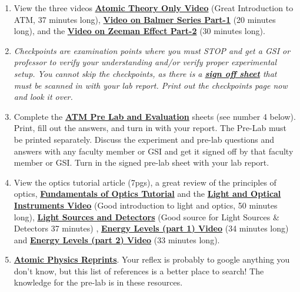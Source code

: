 \documentclass{../lab}
\begin{document}
\begin{enumerate}
    \item View the three videos \href{http://youtu.be/iJ\_4ygOaE7A}{\textbf{Atomic Theory Only Video}} (Great Introduction to ATM, 37 minutes long), \href{http://youtu.be/M41IKkUAG-A}{\textbf{Video on Balmer Series Part-1}} (20 minutes long), and the \href{http://youtu.be/-l2chO5SLew}{\textbf{Video on Zeeman Effect Part-2}} (30 minutes long).

    \item \emph{Checkpoints are examination points where you must STOP and get a GSI or professor to verify your understanding and/or verify proper experimental setup. You cannot skip the checkpoints, as there is a \href{http://experimentationlab.berkeley.edu/node/128}{\textbf{sign off sheet}} that must be scanned in with your lab report. Print out the checkpoints page now and look it over.}

    \item Complete the \href{http://experimentationlab.berkeley.edu/ATMPreLab}{\textbf{ATM Pre Lab and Evaluation}} sheets (see number 4 below). Print, fill out the answers, and turn in with your report. The Pre-Lab must be printed separately. Discuss the experiment and pre-lab questions and answers with any faculty member or GSI and get it signed off by that faculty member or GSI. Turn in the signed pre-lab sheet with your lab report.

    \item View the optics tutorial article (7pgs), a great review of the principles of optics, \href{http://experimentationlab.berkeley.edu/sites/default/files/QIE/fundamental-Optics.pdf}{\textbf{Fundamentals of Optics Tutorial}}\textbf{ }and the \href{http://youtu.be/zUGBt5vc5FA}{\textbf{Light and Optical Instruments Video}}\textbf{ }(Good introduction to light and optics, 50 minutes long), \href{http://youtu.be/lQKLakISoBA}{\textbf{Light Sources and Detectors}} (Good source for Light Sources \& Detectors 37 minutes) , \href{http://youtu.be/wyBOVjU5bBQ}{\textbf{Energy Levels (part 1) Video}} (34 minutes long) and \href{http://youtu.be/Eypw0DmVBxk}{\textbf{Energy Levels (part 2) Video}} (33 minutes long).

    \item \href{http://physics111.lib.berkeley.edu/Physics111/Reprints/ATM/ATM\_index.html}{\textbf{Atomic Physics Reprints}}. Your reflex is probably to google anything you don't know, but this list of references is a better place to search! The knowledge for the pre-lab is in these resources.


\end{enumerate}
\end{document}
